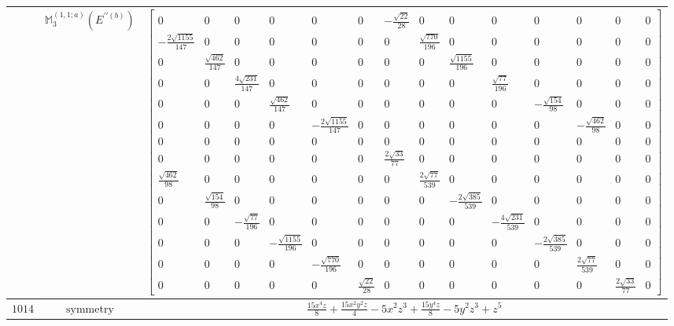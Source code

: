 \documentclass[fleqn,8pt,landscape]{jsarticle}
\begin{document}
\begin{longtable}{ccc}
$  $ & $ \mathbb{M}_{3}^{(1,1;a)}(E^{\prime\prime(b)}) $ & $ \begin{bmatrix} 0 & 0 & 0 & 0 & 0 & 0 & - \frac{\sqrt{22}}{28} & 0 & 0 & 0 & 0 & 0 & 0 & 0 \\ - \frac{2 \sqrt{1155}}{147} & 0 & 0 & 0 & 0 & 0 & 0 & \frac{\sqrt{770}}{196} & 0 & 0 & 0 & 0 & 0 & 0 \\ 0 & \frac{\sqrt{462}}{147} & 0 & 0 & 0 & 0 & 0 & 0 & \frac{\sqrt{1155}}{196} & 0 & 0 & 0 & 0 & 0 \\ 0 & 0 & \frac{4 \sqrt{231}}{147} & 0 & 0 & 0 & 0 & 0 & 0 & \frac{\sqrt{77}}{196} & 0 & 0 & 0 & 0 \\ 0 & 0 & 0 & \frac{\sqrt{462}}{147} & 0 & 0 & 0 & 0 & 0 & 0 & - \frac{\sqrt{154}}{98} & 0 & 0 & 0 \\ 0 & 0 & 0 & 0 & - \frac{2 \sqrt{1155}}{147} & 0 & 0 & 0 & 0 & 0 & 0 & - \frac{\sqrt{462}}{98} & 0 & 0 \\ 0 & 0 & 0 & 0 & 0 & 0 & 0 & 0 & 0 & 0 & 0 & 0 & 0 & 0 \\ 0 & 0 & 0 & 0 & 0 & 0 & \frac{2 \sqrt{33}}{77} & 0 & 0 & 0 & 0 & 0 & 0 & 0 \\ \frac{\sqrt{462}}{98} & 0 & 0 & 0 & 0 & 0 & 0 & \frac{2 \sqrt{77}}{539} & 0 & 0 & 0 & 0 & 0 & 0 \\ 0 & \frac{\sqrt{154}}{98} & 0 & 0 & 0 & 0 & 0 & 0 & - \frac{2 \sqrt{385}}{539} & 0 & 0 & 0 & 0 & 0 \\ 0 & 0 & - \frac{\sqrt{77}}{196} & 0 & 0 & 0 & 0 & 0 & 0 & - \frac{4 \sqrt{231}}{539} & 0 & 0 & 0 & 0 \\ 0 & 0 & 0 & - \frac{\sqrt{1155}}{196} & 0 & 0 & 0 & 0 & 0 & 0 & - \frac{2 \sqrt{385}}{539} & 0 & 0 & 0 \\ 0 & 0 & 0 & 0 & - \frac{\sqrt{770}}{196} & 0 & 0 & 0 & 0 & 0 & 0 & \frac{2 \sqrt{77}}{539} & 0 & 0 \\ 0 & 0 & 0 & 0 & 0 & \frac{\sqrt{22}}{28} & 0 & 0 & 0 & 0 & 0 & 0 & \frac{2 \sqrt{33}}{77} & 0 \end{bmatrix} $ \\ \hline
$ 1014 $ & $ \text{symmetry} $ & $ \frac{15 x^{4} z}{8} + \frac{15 x^{2} y^{2} z}{4} - 5 x^{2} z^{3} + \frac{15 y^{4} z}{8} - 5 y^{2} z^{3} + z^{5} $ \\

\end{longtable}
\end{document}
